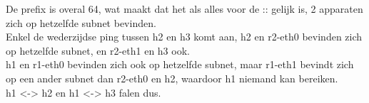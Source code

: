 De prefix is overal 64, wat maakt dat het als alles voor de :: gelijk is, 2 apparaten zich op hetzelfde subnet bevinden.\\
Enkel de wederzijdse ping tussen h2 en h3 komt aan, h2 en r2-eth0 bevinden zich op hetzelfde subnet, en r2-eth1 en h3 ook.\\
h1 en r1-eth0 bevinden zich ook op hetzelfde subnet, maar r1-eth1 bevindt zich op een ander subnet dan r2-eth0 en h2, waardoor h1 niemand kan bereiken.\\
h1 <-> h2 en h1 <-> h3 falen dus.